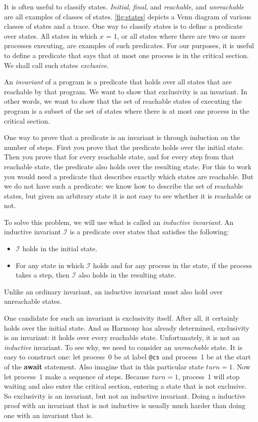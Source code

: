 \documentclass{report}
\begin{document}
It is often useful to classify states.
\emph{Initial}, \emph{final}, and \emph{reachable}, and \emph{unreachable}
are all examples of classes of states.
\autoref{fig:states} depicts a Venn diagram of various classes of states
and a trace.
One way to classify states is to define a predicate over states.
All states in which $x$ = 1, or all states where
there are two or more processes executing, are examples of such predicates.
For our purposes, it is useful to define a predicate that says that at
most one process is in the critical section.  We shall call such states
\emph{exclusive}.

An \emph{invariant} of a program
%
is a predicate that holds over all states that are reachable by that program.
We want to show that exclusivity is an invariant.
In other words, we want to show that the set of reachable states of executing
the program
is a subset of the set of states where there is at most one process in the critical
section.

One way to prove that a predicate is an invariant is through induction
on the number of steps.  First you prove that the predicate holds over
the initial state.  Then you prove that for every reachable state,
and for every step from that reachable state, the predicate also holds
over the resulting state.
For this to work you would need a predicate that describes exactly which
states are reachable.
But we do not have such a predicate: we know how to describe the set
of reachable states, but given an arbitrary state it is not easy to
see whether it is reachable or not.

To solve this problem, we will use what is called an
\emph{inductive invariant}.
%
An inductive invariant $\mathcal{I}$ is a predicate over states that satisfies the following:
\begin{itemize}
\item $\mathcal{I}$ holds in the initial state.
\item For any state in which $\mathcal{I}$ holds and for any process in the
state, if the process takes a step, then $\mathcal{I}$ also holds in the resulting state.
\end{itemize}
Unlike an ordinary invariant, an inductive invariant must also hold over unreachable states.

One candidate for such an invariant is exclusivity itself.
After all, it certainly holds over the initial state.
And as Harmony has already determined, exclusivity is an invariant:
it holds over every reachable state.
Unfortunately, it is not an \emph{inductive} invariant.
To see why, we need to consider an \emph{unreachable} state.
It is easy to construct one: let process~0 be at label \texttt{@cs}
and process~1 be at the start of the \textbf{await} statement.
Also imagine that in this particular state $\mathit{turn} = 1$.  Now let
process~1 make a sequence of steps.  Because $\mathit{turn} = 1$,
process~1 will stop waiting and also enter the critical
section, entering a state that is not exclusive.
So exclusivity is an invariant, but not an inductive invariant.
Doing a inductive proof with an invariant that is not inductive is usually
much harder than doing one with an invariant that is.
\end{document}
